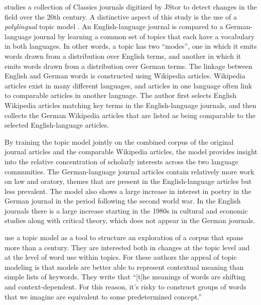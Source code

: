 \cite{Mimno-12b} studies a collection of Classics journals digitized by JStor to detect changes in the field over the 20th century.
A distinctive aspect of this study is the use of a {\em polylingual} topic model \cite{mimno-09}.
An English-language journal is compared to a German-language journal by learning a common set of topics that each have a vocabulary in both languages.
In other words, a topic has two ``modes'', one in which it emits words drawn from a distribution over English terms, and another in which it emits words drawn from a distribution over German terms.
The linkage between English and German words is constructed using Wikipedia articles.
Wikipedia articles exist in many different languages, and articles in one language often link to comparable articles in another language.
The author first selects English Wikipedia articles matching key terms in the English-language journals, and then collects the German Wikipedia articles that are listed as being comparable to the selected English-language articles.

By training the topic model jointly on the combined corpus of the original journal articles and the comparable Wikipedia articles, the model provides insight into the relative concentration of scholarly interests across the two language communities.
The German-language journal articles contain relatively more work on law and oratory, themes that are present in the English-language articles but less prevalent.
The model also shows a large increase in  interest in poetry in the German journal in the period following the second world war.
In the English journals there is a large increase starting in the 1980s in cultural and economic studies along with critical theory, which does not appear in the German journals.

\cite{Goldstone-14} use a topic model as a tool to structure an exploration of a corpus that spans more than a century.
They are interested both in changes at the topic level and at the level of word use within topics.
For these authors the appeal of topic modeling is that models are better able to represent contextual meaning than simple lists of keywords. They write that ``[t]he meanings
of words are shifting and context-dependent. For this reason, it’s risky to
construct groups of words that we imagine are equivalent to some predetermined
concept.''

